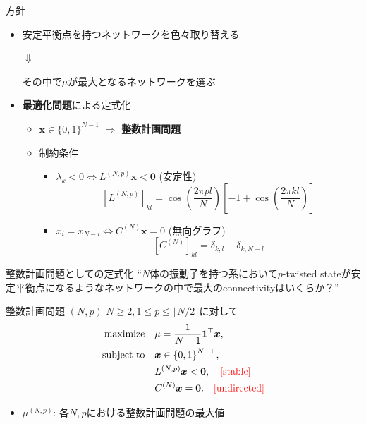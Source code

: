 \begin{frame}{方針}
\begin{itemize}
    \item 安定平衡点を持つネットワークを色々取り替える\\
    \begin{center}
        $\Downarrow$\\
    \end{center}
    その中で$\mu$が最大となるネットワークを選ぶ
    \item \textbf{最適化問題}による定式化
    \begin{itemize}
        \item $\bm{x}\in\{0,1\}^{N-1}$ $\Longrightarrow$ \textbf{整数計画問題}
        \item 制約条件
        \begin{itemize}
            \item $\lambda_{k}<0\Leftrightarrow L^{(N,p)}\bm{x}<\bm{0}$ (安定性)
            \[
                \left[L^{(N,p)}\right]_{kl} = \cos\left(\frac{2\pi pl}{N}\right)\left[-1+\cos\left(\frac{2\pi kl}{N}\right)\right]
            \]
            \item $x_{i}=x_{N-i} \Leftrightarrow C^{(N)}\bm{x}=0$ (無向グラフ)
            \[
                \left[C^{(N)}\right]_{kl}=\delta_{k,l}-\delta_{k,N-l}
            \]
        \end{itemize}
    \end{itemize}
\end{itemize}
\end{frame}

\begin{frame}{整数計画問題としての定式化}
``$N$体の振動子を持つ系において$p$-twisted stateが安定平衡点になるようなネットワークの中で最大のconnectivityはいくらか？''
\begin{block}{整数計画問題 $(N,p)$}
$N\geq2,1\leq p\leq\lfloor N/2\rfloor$に対して
\begin{align*}
\begin{split}
\textrm{maximize} & \quad\mu=\frac{1}{N-1}\bm{1}^{\top}\bm{x}, \\
\textrm{subject to} & \quad \bm{x}\in\left\{0,1\right\}^{N-1},\\
& \quad L^{(N,p)}\bm{x}<\bm{0},\quad \textcolor{red}{\mathrm{[stable]}}\\
& \quad C^{(N)}\bm{x} = \bm{0}.\quad \textcolor{red}{\mathrm{[undirected]}}
\end{split}
\end{align*}
\end{block}
\begin{itemize}
    \item $\mu^{(N,p)}$: 各$N,p$における整数計画問題の最大値
\end{itemize}    
\end{frame}

